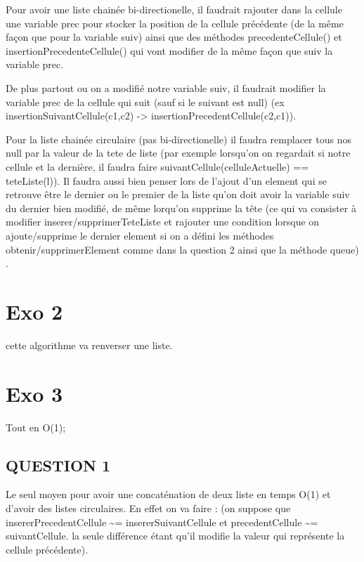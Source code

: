 \documentclass[11pt]{article}
\begin{document}
Pour avoir une liste chainée bi-directionelle, il faudrait rajouter dans la cellule une variable prec pour stocker la position de la cellule précédente (de la même façon que pour la variable suiv)
ainsi que des méthodes precedenteCellule() et insertionPrecedenteCellule() qui vont modifier de la même façon que suiv la variable prec.

De plus partout ou on a modifié notre variable suiv, il faudrait modifier la variable prec de la cellule qui suit (sauf si le suivant est null) (ex insertionSuivantCellule(c1,c2) -> insertionPrecedentCellule(c2,c1)).

Pour la liste chainée circulaire (pas bi-directionelle) il faudra remplacer tous nos null par la valeur de la tete de liste (par exemple lorsqu'on on regardait si notre cellule et la dernière, il faudra faire suivantCellule(celluleActuelle) == teteListe(l)). Il faudra aussi bien penser lors de l'ajout d'un element qui se retrouve être le dernier ou le premier de la liste qu'on doit avoir la variable suiv du dernier bien modifié, de même lorqu'on supprime la tête (ce qui va consister à modifier inserer/supprimerTeteListe et rajouter une condition lorsque on ajoute/supprime le dernier element si on a défini les méthodes obtenir/supprimerElement comme dans la question 2 ainsi que la méthode queue) .  

\section{Exo 2}
\label{sec:org728ea0a}

cette algorithme va renverser une liste.

\section{Exo 3}
\label{sec:org0449a43}
Tout en O(1);
\subsection{QUESTION 1}
\label{sec:org05d027b}

Le seul moyen pour avoir une concaténation de deux liste en temps O(1) et d'avoir des listes circulaires. En effet on va faire : 
(on suppose que insererPrecedentCellule \textasciitilde{}= insererSuivantCellule 
 et precedentCellule \textasciitilde{}= suivantCellule.
 la seule différence étant qu'il modifie la valeur qui représente la cellule précédente). 
\end{document}
